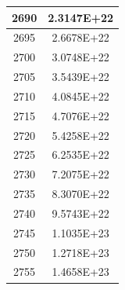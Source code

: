 \documentclass[a4paper]{article}
\begin{document}
\begin{tabular}{|c|c|}
		\hline
		2690 & 2.3147E+22 \\
		\hline
		2695 & 2.6678E+22 \\
		\hline
		2700 & 3.0748E+22 \\
		\hline
		2705 & 3.5439E+22 \\
		\hline
		2710 & 4.0845E+22 \\
		\hline
		2715 & 4.7076E+22 \\
		\hline
		2720 & 5.4258E+22 \\
		\hline
		2725 & 6.2535E+22 \\
		\hline
		2730 & 7.2075E+22 \\
		\hline
		2735 & 8.3070E+22 \\
		\hline
		2740 & 9.5743E+22 \\
		\hline
		2745 & 1.1035E+23 \\
		\hline
		2750 & 1.2718E+23 \\
		\hline
		2755 & 1.4658E+23 \\
		\hline
	\end{tabular}
	\hfill
\end{document}
